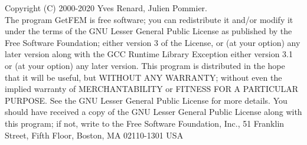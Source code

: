 Copyright (C) 2000-2020 Yves Renard, Julien Pommier.\\
The program GetFEM is free software; you can redistribute it and/or modify
it under the terms of the GNU Lesser General Public License as published by
the Free Software Foundation; either version 3 of the License, or
(at your option) any later version along with the GCC Runtime Library
Exception either version 3.1 or (at your option) any later version.
This program is distributed in the hope that it will be useful,
but WITHOUT ANY WARRANTY; without even the implied warranty of
MERCHANTABILITY or FITNESS FOR A PARTICULAR PURPOSE.  See the
GNU Lesser General Public License for more details.
You should have received a copy of the GNU  Lesser General Public License
along with this program; if not, write to the Free Software Foundation,
Inc., 51 Franklin Street, Fifth Floor, Boston, MA  02110-1301  USA